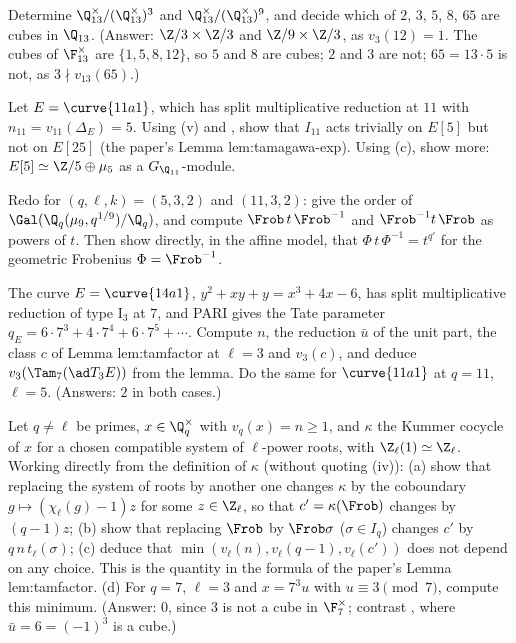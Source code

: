 \begin{exercise}\label{ex:local:ex-cubes13}
Determine $\Q_{13}^\times/(\Q_{13}^\times)^3$ and $\Q_{13}^\times/(\Q_{13}^\times)^9$, and decide which of $2$, $3$, $5$, $8$, $65$ are cubes in $\Q_{13}$.
(Answer: $\Z/3\times\Z/3$ and $\Z/9\times\Z/3$, as $v_3(12)=1$. The cubes of $\F_{13}^\times$ are $\{1,5,8,12\}$, so $5$ and $8$ are cubes; $2$ and $3$ are not;
$65=13\cdot5$ is not, as $3\nmid v_{13}(65)$.)
\end{exercise}

\begin{exercise}\label{ex:local:ex-11a1}
Let $E=\curve{11a1}$, which has split multiplicative reduction at $11$ with $n_{11}=v_{11}(\Delta_E)=5$. Using (v) and
, show that $I_{11}$ acts trivially on $E[5]$ but not on $E[25]$ (the paper's Lemma lem:tamagawa-exp). Using (c),
show more: $E[5]\simeq\Z/5\oplus\mu_5$ as a $G_{\Q_{11}}$-module.
\end{exercise}

\begin{exercise}\label{ex:local:ex-tame-level}
Redo  for $(q,\ell,k)=(5,3,2)$ and $(11,3,2)$: give the order of $\Gal(\Q_q(\mu_9,q^{1/9})/\Q_q)$, and compute $\Frob\,t\,\Frob^{-1}$ and
$\Frob^{-1}t\,\Frob$ as powers of $t$. Then show directly, in the affine model, that $\Phi\,t\,\Phi^{-1}=t^{q'}$ for the geometric Frobenius $\Phi=\Frob^{-1}$.
\end{exercise}

\begin{exercise}\label{ex:local:ex-14a1}
The curve $E=\curve{14a1}$, $y^2+xy+y=x^3+4x-6$, has split multiplicative reduction of type $\mathrm{I}_3$ at $7$, and PARI gives the Tate parameter
$q_E=6\cdot7^3+4\cdot7^4+6\cdot7^5+\cdots$. Compute $n$, the reduction $\bar u$ of the unit part, the class $c$ of Lemma lem:tamfactor at $\ell=3$ and $v_3(c)$, and deduce
$v_3(\Tam_7(\ad T_3E))$ from the lemma. Do the same for $\curve{11a1}$ at $q=11$, $\ell=5$. (Answers: $2$ in both cases.)
\end{exercise}

\begin{exercise}\label{ex:local:ex-cprime}
Let $q\ne\ell$ be primes, $x\in\Q_q^\times$ with $v_q(x)=n\ge1$, and $\kappa$ the Kummer cocycle of $x$ for a chosen compatible system of $\ell$-power roots,
with $\Z_\ell(1)\simeq\Z_\ell$. Working directly from the definition of $\kappa$ (without quoting (iv)): (a) show that
replacing the system of roots by another one changes $\kappa$ by the coboundary $g\mapsto(\chi_\ell(g)-1)z$ for some $z\in\Z_\ell$, so that
$c'=\kappa(\Frob)$ changes by $(q-1)z$; (b) show that replacing $\Frob$ by $\Frob\sigma$ ($\sigma\in I_q$) changes $c'$ by $q\,n\,t_\ell(\sigma)$; (c) deduce that
$\min(v_\ell(n),v_\ell(q-1),v_\ell(c'))$ does not depend on any choice. This is the quantity in the formula of the paper's Lemma lem:tamfactor. (d) For
$q=7$, $\ell=3$ and $x=7^3u$ with $u\equiv3\pmod7$, compute this minimum. (Answer: $0$, since $3$ is not a cube in $\F_7^\times$; contrast
, where $\bar u=6=(-1)^3$ is a cube.)
\end{exercise}


